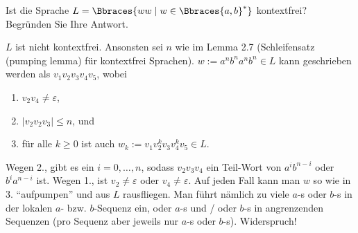 
\begin{exercise}

Ist die Sprache $L = \Bbraces{w w \mid w \in \Bbraces{a, b}^\ast}$ kontextfrei?
Begründen Sie Ihre Antwort.

\end{exercise}


\begin{solution}

$L$ ist nicht kontextfrei.
Ansonsten sei $n$ wie im Lemma 2.7 (Schleifensatz (pumping lemma) für kontextfrei Sprachen).
$w := a^n b^n a^n b^n \in L$ kann geschrieben werden als $v_1 v_2 v_3 v_4 v_5$, wobei

\begin{enumerate}
    \item $v_2 v_4 \neq \varepsilon$,
    \item $|v_2 v_2 v_3| \leq n$, und
    \item für alle $k \geq 0$ ist auch $w_k := v_1 v_2^k v_3 v_4^k v_5 \in L$.
\end{enumerate}

Wegen 2., gibt es ein $i = 0, \dots, n$, sodass $v_2 v_3 v_4$ ein Teil-Wort von $a^i b^{n-i}$ oder $b^i a^{n-i}$ ist.
Wegen 1., ist $v_2 \neq \varepsilon$ oder $v_4 \neq \varepsilon$.
Auf jeden Fall kann man $w$ so wie in 3. \enquote{aufpumpen} und aus $L$ rausfliegen.
Man führt nämlich zu viele $a$-s oder $b$-s in der lokalen $a$- bzw. $b$-Sequenz ein, oder $a$-s und / oder $b$-s in angrenzenden Sequenzen (pro Sequenz aber jeweils nur $a$-s oder $b$-s).
Widerspruch!

\end{solution}

